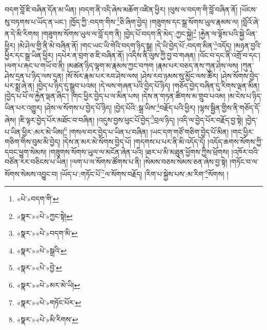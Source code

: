 བདག་བློ་ཇི་བཞིན་དོན་མ་ཡིན། །བདག་ནི་འདི་ཞེས་མཆོག་འཛིན་ཕྱིར། །ལུས་ལ་བདག་གི་བློ་བཞིན་ནོ། །ཡོངས་སུ་བཏགས་པ་ཡོད་ན་ཡང་། །ཁྱོད་ཀྱི་:བདག་གིས་\footnote{«པེ་»བདག་གི་}ཅི་ཞིག་བྱེད། །གཟུགས་དང་སྒྲ་སོགས་ཡུལ་རྣམས་ལ། །བློའོ་ཞེ་ན་དེ་མི་རིགས། །གཟུགས་སོགས་ཡུལ་ལ་བློ་དག་ནི། །བྱེད་པོ་བདག་ནི་མེད་:ཀྱང་སྐྱེ།\footnote{«སྣར་»«པེ་»ཀྱང་སྟེ།} །རྐྱེན་ལ་ལྟོས་པའི་སྐྱེ་ཡིན་ཕྱིར། །མེ་ཤེལ་གྱི་ནི་མེ་བཞིན་ནོ། །གང་ཡང་ཡི་གེའི་བདག་ཉིད་སྒྲ། །དེ་ཡི་བྱེད་པོ་:བདག་མིན་\footnote{«སྣར་»«པེ་»བདག་མི་}འདོད། །མཉན་བྱའི་ཕྱིར་དང་སྒྲ་ཡིན་ཕྱིར། །དཔེར་ན་བྲག་ཅ་ཇི་བཞིན་ནོ། །འདིས་ནི་ལུས་ཀྱི་བྱ་བ་གཞན། །འོང་བ་དང་ནི་འགྲོ་བ་དང་། །ལག་པ་རྐང་པ་གཡོ་བ་ནི། །མཚན་ཉིད་ལྷག་མ་རྣམས་ཀྱང་བཀག །རྣམ་པར་བཅད་ནས་ཀུན་ཤེས་ལས། །ཀུན་ཤེས་དྲན་པ་ཉིད་ལས་དྲན། །སོ་སོར་རྣམ་པར་རབ་ཤེས་ལས། །ཤེས་རབ་ཉམས་སུ་མྱོང་ལས་ཚོར། །ཤེས་སོགས་བྱེད་པར་སྨྲ་ཞེ་ན། །བྱེད་པ་ཉིད་དུ་སྒྲུབ་པའམ། །དེ་ལས་གཞན་པའི་བྱེད་པོ་ཉིད། །གཅོད་བྱེད་བཞིན་དུ་རིགས་ལྡན་མིན། །བྱེད་པ་པོ་ལ་རྐྱེན་ལྡན་ཞིང་། །གང་ཕྱིར་བྱེད་པ་ལ་མིན་པས། །དེས་ན་གཏན་ཚིགས་མ་གྲུབ་པའམ། །མ་ངེས་པ་ཉིད་ཡིན་པར་འགྱུར། །ཤེས་ལ་སོགས་པ་བྱེད་པོ་ཉིད། །བྱེད་པོའི་:སྒྲ་ཡིས་\footnote{«སྣར་»«པེ་»སྒྲའི་}བརྗོད་པའི་ཕྱིར། །ལྷས་སྦྱིན་གྱིས་ནི་གཅོད་དོ་ཞེས། །ཇི་ལྟར་བྱེད་པོར་མཐོང་བ་བཞིན། །འདུས་བྱས་ཕུང་པོ་བྱེད་\footnote{«སྣར་»«པེ་»བྱེ་}བྲལ་ཉིད། །འདི་ལ་བྱེད་པོར་བརྗོད་བྱ་སྟེ། །བྱེད་པ་ཡིན་ཕྱིར་:མར་མེ་ཡིས།\footnote{«སྣར་»«པེ་»མར་མེ་ཡི།} །གསལ་བར་བྱེད་པ་ཡིན་པ་བཞིན། །ཡང་དག་གཙོ་གཅིག་བྱེད་པོ་མིན། །གང་ཕྱིར་གཅིག་གིས་བུམ་མི་བྱེད། །དེས་ན་མར་མེ་སོགས་བྱེད་པོ། །གདགས་པ་པར་ནི་མི་འདོད་དོ། །འདོད་ཆགས་སོགས་ཀྱི་དབང་ཕྱུག་སེམས། །གཟུགས་སོགས་ཡུལ་ལ་མངོན་ཞེན་པའི། །ཐར་པ་མི་མཐུན་ཕྱོགས་ཀྱིས་ཕྲོགས། །འཁོར་བའི་བཙོན་རར་བཅིངས་པ་ཡིན། །ལག་པ་ལ་སོགས་ཚོགས་པ་ནི། །སེམས་བཅས་སེམས་ཅན་ཞེས་བྱ་སྟེ། །གཏོང་བ་ལ་སོགས་སེམས་འབྱུང་བ། །ཡོད་པ་:གཏོང་པོ་\footnote{«སྣར་»«པེ་»གཏོང་པོར་}ལ་སོགས་བརྗོད། །རིག་པ་སྐྱེས་པས་:མ་རིག་\footnote{«སྣར་»«པེ་»མི་རིགས་}སོགས། །

